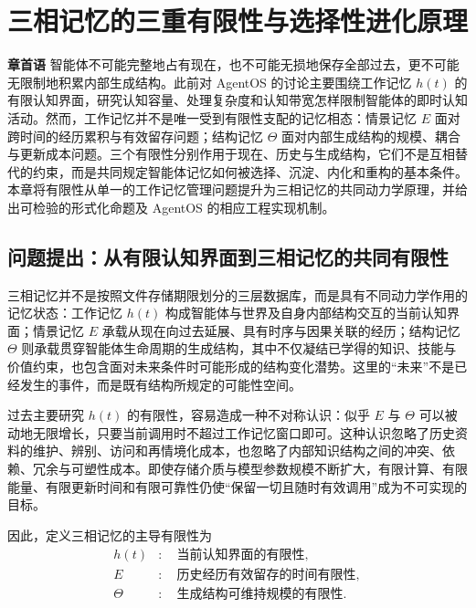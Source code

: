 \chapter{三相记忆的三重有限性与选择性进化原理}
\label{chap:three-phase-finitude}

\noindent\textbf{章首语}\quad
智能体不可能完整地占有现在，也不可能无损地保存全部过去，更不可能无限制地积累内部生成结构。此前对 AgentOS 的讨论主要围绕工作记忆 $h(t)$ 的有限认知界面，研究认知容量、处理复杂度和认知带宽怎样限制智能体的即时认知活动。然而，工作记忆并不是唯一受到有限性支配的记忆相态：情景记忆 $E$ 面对跨时间的经历累积与有效留存问题；结构记忆 $\Theta$ 面对内部生成结构的规模、耦合与更新成本问题。三个有限性分别作用于现在、历史与生成结构，它们不是互相替代的约束，而是共同规定智能体记忆如何被选择、沉淀、内化和重构的基本条件。本章将有限性从单一的工作记忆管理问题提升为三相记忆的共同动力学原理，并给出可检验的形式化命题及 AgentOS 的相应工程实现机制。

\section{问题提出：从有限认知界面到三相记忆的共同有限性}
\label{sec:tri-finitude-intro}

三相记忆并不是按照文件存储期限划分的三层数据库，而是具有不同动力学作用的记忆状态：工作记忆 $h(t)$ 构成智能体与世界及自身内部结构交互的当前认知界面；情景记忆 $E$ 承载从现在向过去延展、具有时序与因果关联的经历；结构记忆 $\Theta$ 则承载贯穿智能体生命周期的生成结构，其中不仅凝结已学得的知识、技能与价值约束，也包含面对未来条件时可能形成的结构变化潜势。这里的“未来”不是已经发生的事件，而是既有结构所规定的可能性空间。

过去主要研究 $h(t)$ 的有限性，容易造成一种不对称认识：似乎 $E$ 与 $\Theta$ 可以被动地无限增长，只要当前调用时不超过工作记忆窗口即可。这种认识忽略了历史资料的维护、辨别、访问和再情境化成本，也忽略了内部知识结构之间的冲突、依赖、冗余与可塑性成本。即使存储介质与模型参数规模不断扩大，有限计算、有限能量、有限更新时间和有限可靠性仍使“保留一切且随时有效调用”成为不可实现的目标。

因此，定义三相记忆的主导有限性为
\begin{equation}
\label{eq:three-finitudes}
\boxed{\begin{aligned}
 h(t)&:\quad \text{当前认知界面的有限性},\\
 E&:\quad \text{历史经历有效留存的时间有限性},\\
 \Theta&:\quad \text{生成结构可维持规模的有限性}.
\end{aligned}}
\end{equation}

